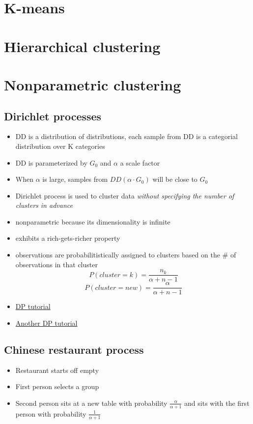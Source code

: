 \documentclass[../main.tex]{subfiles}
\begin{document}
\section{K-means}

\section{Hierarchical clustering}

\section{Nonparametric clustering}

  \subsection{Dirichlet processes}
  \begin{itemize}
    \item DD is a distribution of distributions, each sample from DD is a categorial distribution over K categories
    \item DD is parameterized by $G_{0}$ and $\alpha$ a scale factor
    \item When $\alpha$ is large, samples from $DD(\alpha \cdot G_{0})$ will be close to $G_{0}$
    \item Dirichlet process is used to cluster data \textit{without specifying the number of clusters in advance}
    \item nonparametric because its dimensionality is infinite
    \item exhibits a rich-gets-richer property
    \item observations are probabilitistically assigned to clusters based on the $\#$ of observations in that cluster
    \begin{equation*}
      P(cluster=k) = \frac{n_{k}}{\alpha + n - 1}
    \end{equation*}
    \begin{equation*}
      P(cluster=new) = \frac{\alpha}{\alpha + n - 1}
    \end{equation*}
    \item \href{http://phyletica.org/dirichlet-process/}{DP tutorial}
    \item \href{http://blog.echen.me/2012/03/20/infinite-mixture-models-with-nonparametric-bayes-and-the-dirichlet-process/}{Another DP tutorial}
  \end{itemize}
  \subsection{Chinese restaurant process}
  \begin{itemize}
    \item Restaurant starts off empty
    \item First person selects a group
    \item Second person sits at a new table with probability $\frac{\alpha}{\alpha + 1}$ and sits with the first person with probability $\frac{1}{\alpha + 1}$
  \end{itemize}
\end{document}
